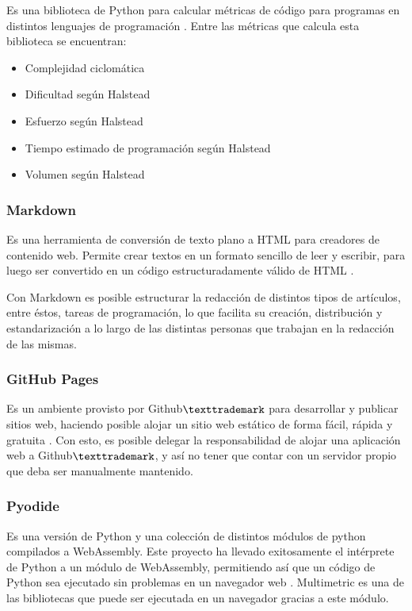 \documentclass[letterpaper,12pt]{article}
\begin{document}
Es una biblioteca de Python para calcular métricas de código para programas en distintos lenguajes de programación \cite{privkweihmann_multimetric}. Entre las métricas que calcula esta biblioteca se encuentran:

\begin{itemize}
  \item Complejidad ciclomática
  \item Dificultad según Halstead
  \item Esfuerzo según Halstead
  \item Tiempo estimado de programación según Halstead
  \item Volumen según Halstead
\end{itemize}

\subsubsection{Markdown}

Es una herramienta de conversión de texto plano a HTML para creadores de contenido web. Permite crear textos en un formato sencillo de leer y escribir, para luego ser convertido en un código estructuradamente válido de HTML \cite{DFMarkdown}.

Con Markdown es posible estructurar la redacción de distintos tipos de artículos, entre éstos, tareas de programación, lo que facilita su creación, distribución y estandarización a lo largo de las distintas personas que trabajan en la redacción de las mismas.

\subsubsection{GitHub Pages}

Es un ambiente provisto por Github$\texttrademark$ para desarrollar y publicar sitios web, haciendo posible alojar un sitio web estático de forma fácil, rápida y gratuita \cite{Utomo_2020}. Con esto, es posible delegar la responsabilidad de alojar una aplicación web a Github$\texttrademark$, y así no tener que contar con un servidor propio que deba ser manualmente mantenido.

\subsubsection{Pyodide}

Es una versión de Python y una colección de distintos módulos de python compilados a \nohyphens{WebAssembly}. Este proyecto ha llevado exitosamente el intérprete de Python a un módulo de WebAssembly, permitiendo así que un código de Python sea ejecutado sin problemas en un navegador web \cite{huffman2023julia}. Multimetric es una de las bibliotecas que puede ser ejecutada en un navegador gracias a este módulo.
\end{document}
